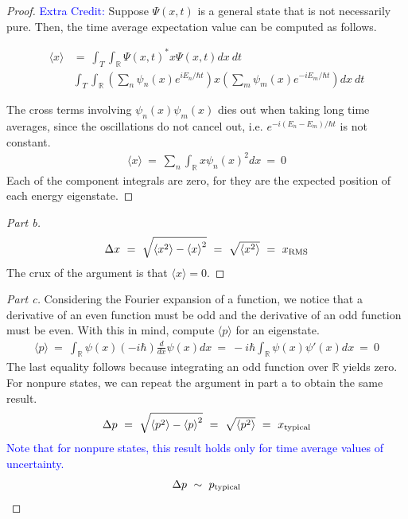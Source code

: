 \documentclass{article}
\numberwithin{equation}{section}
\def\<{{\langle}}
\def\>{{\rangle}}
\newcommand{\deriv}[2]{
\frac {d {#1} } {d {#2}}
}
\newcommand{\RR}{\mathbb{R}}
\begin{document}
\begin{proof}
\textcolor{blue}{Extra Credit:} Suppose $\Psi(x, t)$ 
is a general state that is not necessarily pure. Then, 
the time average expectation value can be computed as follows. 

\begin{align}
    \<x\> & = \ \int_T \int_\RR \Psi(x, t)^*x \Psi(x, t)dx \ dt \\ 
    & \int_T \int_\RR \left(\sum_n \psi_n(x) e^{iE_n/\hbar t} \right) x \left(\sum_m \psi_m(x)e^{-iE_m/\hbar t}\right) dx \ dt
\end{align}

The cross terms involving $\psi_n(x)\psi_m(x)$ dies out 
when taking long time averages, since the oscillations do not cancel out, 
i.e. $e^{-i(E_n - E_m)/\hbar t}$ is not constant. 
\begin{align}
    \<x\> \ =\ \sum_n \int_\RR x \psi_n(x)^2 dx \ =\  0
\end{align}
Each of the component integrals are zero, for they are the 
expected position of each energy eigenstate. 
\end{proof}

\begin{proof}
    [Part b]
    \begin{align}
        \Delta x \ = \ \sqrt{\<x^2\> - \<x\>^2} \ = \ \sqrt{\<x^2\>} \ = \ x_{\rm RMS}
    \end{align}
    The crux of the argument is that $\<x\> = 0$. 
\end{proof}

\begin{proof}
    [Part c]
    Considering the Fourier expansion of a function, we notice 
    that a derivative of an even function must be odd and 
    the derivative of an odd function must be even. With this 
    in mind, compute $\<p\>$ for an eigenstate. 
    \begin{align}
        \<p\> \ = \ \int_\RR \psi(x) (-i\hbar)\deriv {}{x} \psi(x) dx 
        \ = \ -i\hbar \int_\RR\psi(x)\psi'(x) dx \ = \ 0 
    \end{align}
    The last equality follows because integrating an odd function 
    over $\RR$ yields zero. For nonpure states, we can repeat the 
    argument in part a to obtain the same result.
\begin{align}
        \Delta p \ = \ \sqrt{\<p^2\> - \<p\>^2} \ = \ \sqrt{\<p^2\>} \ = \ x_{\rm typical}
    \end{align}
 \textcolor{blue}
    {Note that for nonpure states, this result holds only for time average values of uncertainty. }
    \begin{align}
        \Delta p \ \sim \ p_{\rm typical}
    \end{align}
\end{proof}
\end{document}
